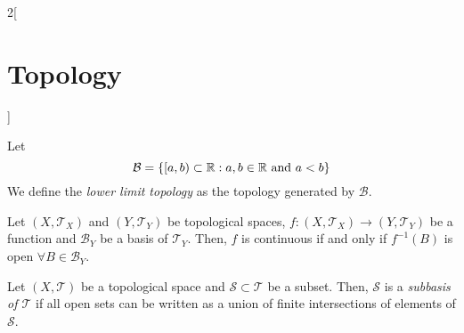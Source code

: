 \documentclass[../../../main.tex]{subfiles}
\begin{document}
\begin{multicols}{2}[\section{Topology}]
\begin{definition}
  \end{definition}
  \begin{definition}
    Let $$\mathcal{B}=\{[a,b)\subset\mathbb{R}:a,b\in\mathbb{R}\text{ and }a<b\}$$
    We define the \textit{lower limit topology} as the topology generated by $\mathcal{B}$.
  \end{definition}
  \begin{theorem}
    Let $(X,\mathcal{T}_X)$ and $(Y,\mathcal{T}_Y)$ be topological spaces, $f:(X,\mathcal{T}_X)\rightarrow (Y,\mathcal{T}_Y)$ be a function and $\mathcal{B}_Y$ be a basis of $\mathcal{T}_Y$. Then, $f$ is continuous if and only if $f^{-1}(B)$ is open $\forall B\in \mathcal{B}_Y$.
  \end{theorem}
  \begin{definition}
    Let $(X,\mathcal{T})$ be a topological space and $\mathcal{S}\subset\mathcal{T}$ be a subset. Then, $\mathcal{S}$ is a \textit{subbasis of $\mathcal{T}$} if all open sets can be written as a union of finite intersections of elements of $\mathcal{S}$.
  \end{definition}

\end{multicols}
\end{document}
